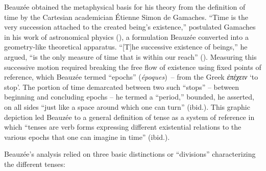 \documentclass[output=paper]{langsci/langscibook}
\begin{document}
 Beauzée obtained the metaphysical basis for his theory from the definition of time by the Cartesian academician Étienne Simon de Gamaches. “Time is the very succession attached to the created being’s existence,” postulated Gamaches in his work of astronomical physics (\citeyear[28]{gamaches_astronomie_1740}), a formulation Beauzée converted into a geometry-like theoretical apparatus. “[T]he successive existence of beings,” he argued, “is the only measure of time that is within our reach” (\citealt[96]{beauzee_tems_1765}). Measuring this successive motion required breaking the free flow of existence using fixed points of reference, which Beauzée termed “epochs” (\textit{époques})~-- from the Greek \textit{ἐπέχειν} `to stop'. The portion of time demarcated between two such “stops” -- between beginning and concluding epochs -- he termed a “period,” bounded, he asserted, on all sides “just like a space around which one can turn” (ibid.). This graphic depiction led Beauzée to a general definition of tense as a system of reference in which “tenses are verb forms expressing different existential relations to the various epochs that one can imagine in time” (ibid.).
 
 Beauzée’s analysis relied on three basic distinctions or “divisions” characterizing the different tenses:
 
\end{document}
